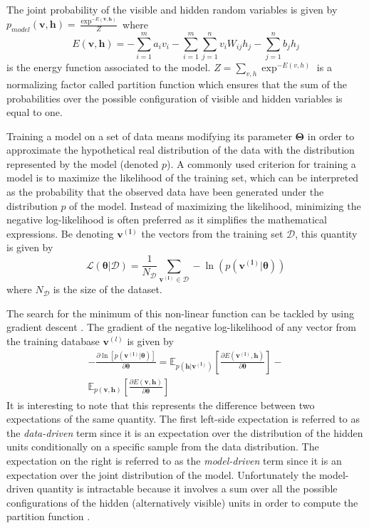 \documentclass{amsart}
\begin{document}
	The joint probability of the visible and hidden random variables is given by $p_{model}(\bm{v},\bm{h}) = \frac{\exp^{-E(\bm{v},\bm{h})}}{Z}$ where
	\begin{equation}
	\label{eq:energy}
	E(\bm{v},\bm{h}) = - \sum_{i=1}^{m} a_{i} v_{i}  - \sum_{i=1}^{m} \sum_{j=1}^{n} v_{i} W_{ij} h_{j} - \sum_{j = 1}^{n} b_{j} h_{j}
	\end{equation}
	is the energy function associated to the model. $Z = \sum_{v,h}\exp^{-E(v,h)}$ is a normalizing factor called partition function which ensures that the sum of the probabilities over the possible configuration of visible and hidden variables is equal to one.
	
	Training a model on a set of data means modifying its parameter $\bm{\Theta}$ in order to approximate the hypothetical real distribution of the data with the distribution represented by the model (denoted $p$).
	A commonly used criterion for training a model is to maximize the likelihood of the training set, which can be interpreted as the probability that the observed data have been generated under the distribution $p$ of the model.
	Instead of maximizing the likelihood, minimizing the negative log-likelihood is often preferred as it simplifies the mathematical expressions. Be denoting $\bm{v^{(l)}}$ the vectors from the training set $\mathcal{D}$, this quantity is given by
	\begin{equation}
	\label{eq:likelihood}
	\mathcal{L(\bm{\theta}|\mathcal{D})}  = \frac{1}{N_{\mathcal{D}}} \sum_{\bm{v^{(l)}} \in \mathcal{D}} - \ln \left( p(\bm{v^{(l)}}|\bm{\theta})\right)
	\end{equation}
	where $N_{\mathcal{D}}$ is the size of the dataset. 
	
	The search for the minimum of this non-linear function can be tackled by using gradient descent \cite{bottou2010large}. The gradient of the negative log-likelihood of any vector from the training database $\bm{v}^{(l)}$ is given by
	\begin{equation}
	\label{eq:loglik}
	\begin{split}
	- \frac{\partial \ln \left[ p(\bm{v^{(l)}}|\bm{\theta})\right]}{\partial \bm{\theta}} 
	= 
	\mathbb{E}_{p(\bm{h}|\bm{v^{(l)}})} \left[ \frac{\partial E(\bm{v^{(l)}},\bm{h})}{\partial \bm{\theta}} \right] 
	- \\
	\mathbb{E}_{p(\bm{v} , \bm{h})} \left[ \frac{\partial E(\bm{v},\bm{h})}{\partial \bm{\theta}} \right]
	\end{split}
	\end{equation}
	It is interesting to note that this represents the difference between two expectations of the same quantity. The first left-side expectation is referred to as the \textit{data-driven} term since it is an expectation over the distribution of the hidden units conditionally on a specific sample from the data distribution. The expectation on the right is referred to as the \textit{model-driven} term since it is an expectation over the joint distribution of the model.
	Unfortunately the model-driven quantity is intractable because it involves a sum over all the possible configurations of the hidden (alternatively visible) units in order to compute the partition function \cite{Fischer2012}.
	
\end{document}
